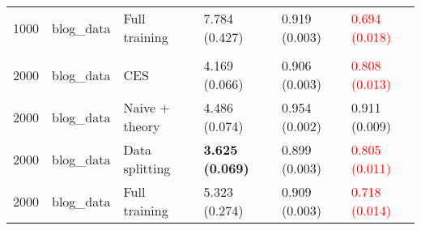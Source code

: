 \begin{tabular}[t]{rlllll}
\hspace{1em}1000 & blog\_data & Full training & 7.784 (0.427) & 0.919 (0.003) & \textcolor{red}{0.694 (0.018)}\\
\addlinespace[0.3em]
\multicolumn{6}{l}{\textbf{2000}}\\
\hspace{1em}2000 & blog\_data & CES & 4.169 (0.066) & 0.906 (0.003) & \textcolor{red}{0.808 (0.013)}\\
\hspace{1em}2000 & blog\_data & Naive + theory & 4.486 (0.074) & 0.954 (0.002) & 0.911 (0.009)\\
\hspace{1em}2000 & blog\_data & Data splitting & \textbf{3.625 (0.069)} & 0.899 (0.003) & \textcolor{red}{0.805 (0.011)}\\
\hspace{1em}2000 & blog\_data & Full training & 5.323 (0.274) & 0.909 (0.003) & \textcolor{red}{0.718 (0.014)}\\
\bottomrule
\end{tabular}

